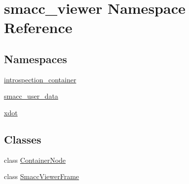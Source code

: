 \hypertarget{namespacesmacc__viewer}{}\section{smacc\+\_\+viewer Namespace Reference}
\label{namespacesmacc__viewer}
\subsection*{Namespaces}
\begin{DoxyCompactItemize}
\item 
 \hyperlink{namespacesmacc__viewer_1_1introspection__container}{introspection\+\_\+container}
\item 
 \hyperlink{namespacesmacc__viewer_1_1smacc__user__data}{smacc\+\_\+user\+\_\+data}
\item 
 \hyperlink{namespacesmacc__viewer_1_1xdot}{xdot}
\end{DoxyCompactItemize}
\subsection*{Classes}
\begin{DoxyCompactItemize}
\item 
class \hyperlink{classsmacc__viewer_1_1ContainerNode}{Container\+Node}
\item 
class \hyperlink{classsmacc__viewer_1_1SmaccViewerFrame}{Smacc\+Viewer\+Frame}
\end{DoxyCompactItemize}
